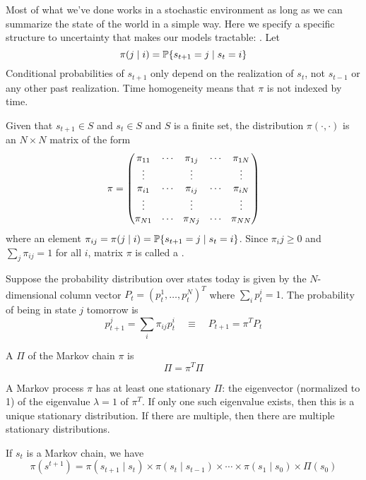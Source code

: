 \documentclass[10pt]{article}
\begin{document}
\begin{model}
	 Most of what we've done works in a stochastic environment as long as we can summarize the state of the world in  a simple way. Here we specify a specific structure to uncertainty that makes our models tractable: . Let
	\[
	\pi( j \mid i) = \mathbb{P}\{s_{t+1} = j \mid s_t = i\}
	\]
	Conditional probabilities of $s_{t+1}$ only depend on the realization of $s_t$, not $s_{t-1}$ or any other past realization. Time homogeneity means that $\pi$ is not indexed by time.
	
	Given that $s_{t+1} \in S$ and $s_t \in S$ and $S$ is a finite set, the distribution $\pi( \cdot, \cdot)$ is an $N \times N$ matrix of the form
	\[
	\pi = \begin{pmatrix}\pi_{11} & \cdots &  \pi_{1j} & \cdots &\pi_{1N} \\ \vdots & & \vdots & & \vdots \\ \pi_{i1} & \cdots &  \pi_{ij} & \cdots & \pi_{iN} \\ \vdots & & \vdots & & \vdots \\ \pi_{N1} & \cdots &  \pi_{Nj} & \cdots & \pi_{NN} \end{pmatrix}
	\]
	where an element $\pi_{ij} = \pi(j \mid i) = \mathbb{P}\{s_{t+1} = j \mid s_t = i\}$. Since $\pi_ij \ge 0$ and $\sum_j \pi_{ij} = 1$ for all $i$, matrix $\pi$ is called a .
	
	Suppose the probability distribution over states today is given by the $N$-dimensional column vector $P_t = (p_t^1,\dots,p_t^N)^T$ where $\sum_i p_t^i = 1$. The probability of being in state $j$ tomorrow is
	\[
	p_{t+1}^j = \sum_i \pi_{ij} p_t^i \quad \equiv \quad P_{t+1} = \pi^T P_t
	\]
	\end{model}
	
	\begin{definition}
		A  $\Pi$ of the Markov chain $\pi$ is
		\[
		\Pi = \pi^T \Pi
		\]
	\end{definition}
	A Markov process $\pi$ has at least one stationary $\Pi$: the eigenvector (normalized to 1) of the eigenvalue $\lambda = 1$ of $\pi^T$. If only one such eigenvalue exists, then this is a unique stationary distribution. If there are multiple, then there are multiple stationary distributions. 
	
	If $s_t$ is a Markov chain, we have
	\[
	\pi(s^{t+1}) = \pi(s_{t+1} \mid s_t) \times \pi(s_t \mid s_{t-1}) \times \cdots \times \pi(s_1 \mid s_0) \times \Pi(s_0)
	\]
	
\end{document}
